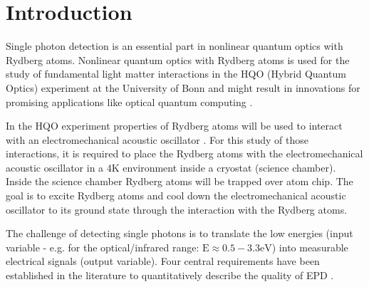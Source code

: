 
\chapter{Introduction}
\label{sec:SNSPD_Introduction}

Single photon detection is an essential part in nonlinear quantum optics with Rydberg atoms. 
Nonlinear quantum optics with Rydberg atoms is used for the study of fundamental light matter interactions in 
the HQO (Hybrid Quantum Optics) experiment at the University of Bonn and might result in innovations for promising
applications like optical quantum computing \cite{firstenberg-2016, gao-2011}.

In the HQO experiment properties of Rydberg atoms will be used to interact with an electromechanical acoustic oscillator \cite{}.
For this study of those interactions, it is required to place the Rydberg atoms with the electromechanical acoustic oscillator
in a 4K environment inside a cryostat (science chamber).
Inside the science chamber Rydberg atoms will be trapped over atom chip.
The goal is to excite Rydberg atoms and cool down the electromechanical acoustic oscillator to its ground state through the interaction with
the Rydberg atoms.



The challenge of detecting single photons is to translate the low energies (input variable - e.g.
for the optical/infrared range: $\text{E} \approx 0.5 - 3.3 \si{\eV}$) into measurable electrical signals (output variable).
Four central requirements have been established in the literature to quantitatively describe the quality of
EPD \cite{hadfield-2009, shalm_single-photon_2013}.

